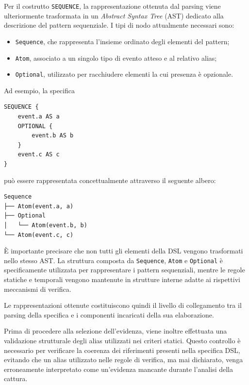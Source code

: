 Per il costrutto \texttt{SEQUENCE}, la rappresentazione ottenuta dal parsing viene ulteriormente trasformata in un \emph{Abstract Syntax Tree} (AST) dedicato alla descrizione del pattern sequenziale. I tipi di nodo attualmente necessari sono:

\begin{itemize}
\tightlist
\item
  \texttt{Sequence}, che rappresenta l'insieme ordinato degli elementi del pattern;
\item
  \texttt{Atom}, associato a un singolo tipo di evento atteso e al relativo alias;
\item
  \texttt{Optional}, utilizzato per racchiudere elementi la cui presenza è opzionale.
\end{itemize}

Ad esempio, la specifica

\par\noindent\begin{minipage}{\linewidth}
\begin{lstlisting}
SEQUENCE {
    event.a AS a
    OPTIONAL {
        event.b AS b
    }
    event.c AS c
}
\end{lstlisting}
\end{minipage}\par

può essere rappresentata concettualmente attraverso il seguente albero:

\begin{verbatim}
Sequence
├── Atom(event.a, a)
├── Optional
│   └── Atom(event.b, b)
└── Atom(event.c, c)
\end{verbatim}


È importante precisare che non tutti gli elementi della DSL vengono trasformati nello stesso AST. La struttura composta da \texttt{Sequence}, \texttt{Atom} e \texttt{Optional} è specificamente utilizzata per rappresentare i pattern sequenziali, mentre le regole statiche e temporali vengono mantenute in strutture interne adatte ai rispettivi meccanismi di verifica.

Le rappresentazioni ottenute costituiscono quindi il livello di collegamento tra il parsing della specifica e i componenti incaricati della sua elaborazione.

Prima di procedere alla selezione dell'evidenza, viene inoltre effettuata una validazione strutturale degli alias utilizzati nei criteri statici. Questo controllo è necessario per verificare la coerenza dei riferimenti presenti nella specifica DSL, evitando che un alias utilizzato nelle regole di verifica, ma mai dichiarato, venga erroneamente interpretato come un'evidenza mancante durante l'analisi della cattura.

